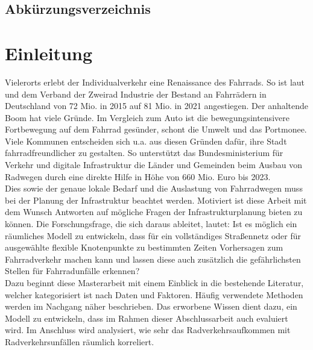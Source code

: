 \documentclass[a4paper,12pt]{thesis}
\begin{document}
\begingroup
\let\clearpage\relax
\listoffigures
\listoftables
\endgroup

\section{Abkürzungsverzeichnis}

\begin{acronym}
\end{acronym}

\chapter{Einleitung}

Vielerorts erlebt der Individualverkehr eine Renaissance des Fahrrads. So ist laut \cite{Eisenberger2015} und dem Verband der Zweirad Industrie \cite{ZIV2022} der Bestand an Fahrrädern in Deutschland von 72 Mio. in 2015 auf 81 Mio. in 2021 angestiegen. Der anhaltende Boom hat viele Gründe. Im Vergleich zum Auto ist die bewegungsintensivere Fortbewegung auf dem Fahrrad gesünder, schont die Umwelt und das Portmonee.\\
Viele Kommunen entscheiden sich u.a. aus diesen Gründen dafür, ihre Stadt fahrradfreundlicher zu gestalten. So unterstützt das Bundesministerium für Verkehr und digitale Infrastruktur \cite{VerkehrunddigitaleInfrastruktur2020} die Länder und Gemeinden beim Ausbau von Radwegen durch eine direkte Hilfe in Höhe von 660 Mio. Euro bis 2023.\\
Dies sowie der genaue lokale Bedarf und die Auslastung von Fahrradwegen muss bei der Planung der Infrastruktur beachtet werden. Motiviert ist diese Arbeit mit dem Wunsch Antworten auf mögliche Fragen der Infrastrukturplanung bieten zu können. Die Forschungsfrage, die sich daraus ableitet, lautet: Ist es möglich ein räumliches Modell zu entwickeln, dass für ein vollständiges Straßennetz oder für ausgewählte flexible Knotenpunkte zu bestimmten Zeiten Vorhersagen zum Fahrradverkehr machen kann und lassen diese auch zusätzlich die gefährlichsten Stellen für Fahrradunfälle erkennen?\\
Dazu beginnt diese Masterarbeit mit einem Einblick in die bestehende Literatur, welcher kategorisiert ist nach Daten und Faktoren. Häufig verwendete Methoden werden im Nachgang näher beschrieben. Das erworbene Wissen dient dazu, ein Modell zu entwickeln, dass im Rahmen dieser Abschlussarbeit auch evaluiert wird. Im Anschluss wird analysiert, wie sehr das Radverkehrsaufkommen mit Radverkehrsunfällen räumlich korreliert.
\end{document}
